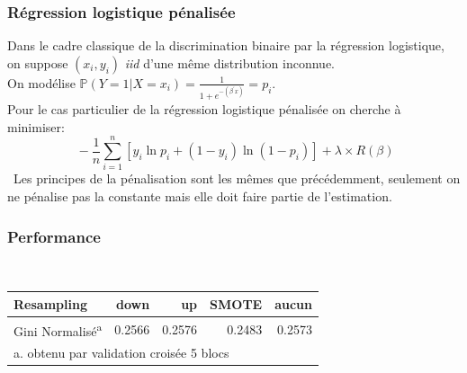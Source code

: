 \documentclass[french]{article}
\begin{document}
\begin{multicols}{2}
\subsubsection{Régression logistique pénalisée}
Dans le cadre classique de la discrimination binaire par la régression logistique, on suppose $(x_i,y_i)$ \emph{iid} d'une même distribution inconnue.\\
On modélise $\mathbb{P}(Y=1|X=x_i)=\frac{1}{1+e^{-\left(\beta^{\prime} x\right)}}=p_i$.\\
Pour le cas particulier de la régression logistique pénalisée on cherche à minimiser:
\[\ -\frac{1}{n} \sum_{i=1}^{n} \left[y_{i} \ln p_{i}+\left(1-y_{i}\right) \ln \left(1-p_{i}\right)\right] +\lambda \times R(\beta) \]\
Les principes de la pénalisation sont les mêmes que précédemment, seulement on ne pénalise pas la constante mais elle doit faire partie de l'estimation.\\


\subsubsection{Performance}

\

\begin{center}\begin{tabular}{l|rrrr}
  Resampling & down & up & SMOTE & aucun \\ \hline
  Gini Normalisé\textsuperscript{a} & 0.2566 & 0.2576 & 0.2483 & 0.2573 \\
  \multicolumn{4}{l}{\footnotesize a. obtenu par validation croisée 5 blocs}
\end{tabular}\end{center}


\end{multicols}
\end{document}
